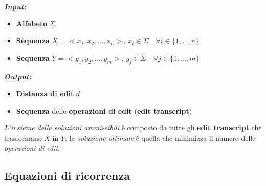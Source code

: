     \noindent \textbf{\textit{Input:}} 
    \begin{itemize}
        \item \textbf{Alfabeto} $\Sigma$
        \item \textbf{Sequenza} $X = <x_1, x_2, ..., x_n>, \, x_i \in \Sigma \quad \forall i \in \{1, ..., n\}$
        \item \textbf{Sequenza} $Y = <y_1, y_2, ..., y_m>, \, y_j \in \Sigma \quad \forall j \in \{1, ..., m\}$
    \end{itemize}
    \textbf{\textit{Output:}} 
    \begin{itemize}
        \item \textbf{Distanza di edit} $d$
        \item \textbf{Sequenza} delle \textbf{operazioni di edit} (\textbf{edit transcript})
    \end{itemize}

    \emph{L'insieme delle soluzioni ammissibili} è composto da tutte gli \textbf{edit transcript} che trasformano $X$ in $Y$; la \emph{soluzione ottimale} è quella che minimizza il numero delle \emph{operazioni di edit}.
    
\subsection{Equazioni di ricorrenza}

